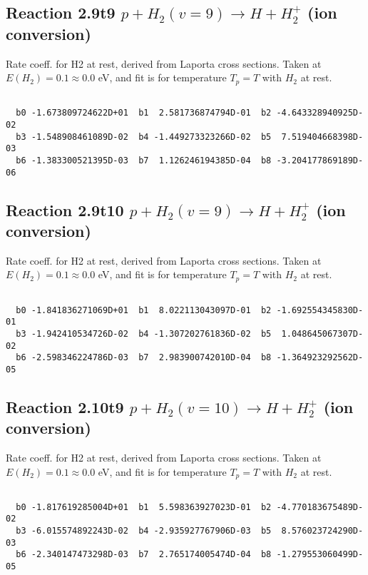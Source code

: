 \documentclass[12pt,dvipdfmx]{article}
\begin{document}
\newpage
\subsection{
Reaction 2.9t9
$ p + H_2(v=9) \rightarrow H + H_2^+$ (ion conversion)
}
Rate coeff. for H2 at rest, derived from Laporta cross sections.
Taken at $E(H_2) = 0.1 \approx 0.0$ eV,  and fit is for temperature $T_p=T$ with $H_2$ at rest.

\begin{small}\begin{verbatim}

  b0 -1.673809724622D+01  b1  2.581736874794D-01  b2 -4.643328940925D-02
  b3 -1.548908461089D-02  b4 -1.449273323266D-02  b5  7.519404668398D-03
  b6 -1.383300521395D-03  b7  1.126246194385D-04  b8 -3.204177869189D-06

\end{verbatim}\end{small}

\newpage
\subsection{
Reaction 2.9t10
$ p + H_2(v=9) \rightarrow H + H_2^+$ (ion conversion)
}
Rate coeff. for H2 at rest, derived from Laporta cross sections.
Taken at $E(H_2) = 0.1 \approx 0.0$ eV,  and fit is for temperature $T_p=T$ with $H_2$ at rest.

\begin{small}\begin{verbatim}

  b0 -1.841836271069D+01  b1  8.022113043097D-01  b2 -1.692554345830D-01
  b3 -1.942410534726D-02  b4 -1.307202761836D-02  b5  1.048645067307D-02
  b6 -2.598346224786D-03  b7  2.983900742010D-04  b8 -1.364923292562D-05

\end{verbatim}\end{small}

\newpage
\subsection{
Reaction 2.10t9
$ p + H_2(v=10) \rightarrow H + H_2^+$ (ion conversion)
}
Rate coeff. for H2 at rest, derived from Laporta cross sections.
Taken at $E(H_2) = 0.1 \approx 0.0$ eV,  and fit is for temperature $T_p=T$ with $H_2$ at rest.

\begin{small}\begin{verbatim}

  b0 -1.817619285004D+01  b1  5.598363927023D-01  b2 -4.770183675489D-02
  b3 -6.015574892243D-02  b4 -2.935927767906D-03  b5  8.576023724290D-03
  b6 -2.340147473298D-03  b7  2.765174005474D-04  b8 -1.279553060499D-05

\end{verbatim}\end{small}
\end{document}
